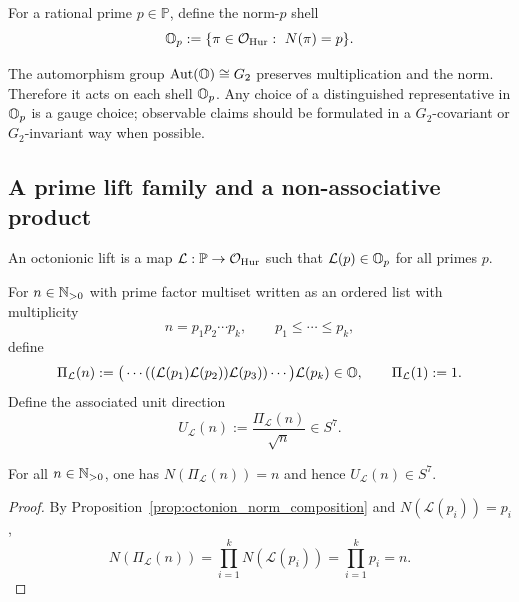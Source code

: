 \begin{definition}
\label{def:octonion_prime_shells}
\InterfaceTag For a rational prime $p\in\mathbb{P}$, define the norm-$p$ shell
\[
\OO_p:=\{\pi\in\OHur:\ N(\pi)=p\}.
\]
\end{definition}

\begin{remark}
\label{rem:g2_gauge_freedom}
\AuditTag The automorphism group $\mathrm{Aut}(\mathbb{O})\cong G_2$ preserves multiplication and the norm.
Therefore it acts on each shell $\mathbb{O}_p$.
Any choice of a distinguished representative in $\mathbb{O}_p$ is a gauge choice; observable claims should be formulated in a $G_2$-covariant or $G_2$-invariant way when possible.
\end{remark}

\subsection{A prime lift family and a non-associative product}
\label{subsec:octonion_prime_lift_product}

\begin{definition}
\label{def:octonion_prime_lift}
\InterfaceTag An octonionic lift is a map $\mathcal{L}:\mathbb{P}\to\mathcal{O}_{\mathrm{Hur}}$ such that $\mathcal{L}(p)\in\mathbb{O}_p$ for all primes $p$.
\end{definition}

\begin{definition}
\label{def:left_normed_prime_product}
\InterfaceTag For $n\in\mathbb{N}_{>0}$ with prime factor multiset written as an ordered list with multiplicity
\[
n=p_1p_2\cdots p_k,\qquad p_1\le \cdots\le p_k,
\]
define
\[
\Pi_{\mathcal{L}}(n):=\big(\cdots((\mathcal{L}(p_1)\mathcal{L}(p_2))\mathcal{L}(p_3))\cdots \big)\mathcal{L}(p_k)\in\mathbb{O},
\qquad
\Pi_{\mathcal{L}}(1):=1.
\]
Define the associated unit direction
\[
U_{\mathcal{L}}(n):=\frac{\Pi_{\mathcal{L}}(n)}{\sqrt{n}}\in S^7.
\]
\end{definition}

\begin{proposition}
\label{prop:octonion_lift_norm_consistency}
\MathTag For all $n\in\mathbb{N}_{>0}$, one has $N(\Pi_{\mathcal{L}}(n))=n$ and hence $U_{\mathcal{L}}(n)\in S^7$.
\end{proposition}
\begin{proof}
By Proposition~\ref{prop:octonion_norm_composition} and $N(\mathcal{L}(p_i))=p_i$,
\[
N(\Pi_{\mathcal{L}}(n))=\prod_{i=1}^k N(\mathcal{L}(p_i))=\prod_{i=1}^k p_i=n.
\]
\end{proof}

